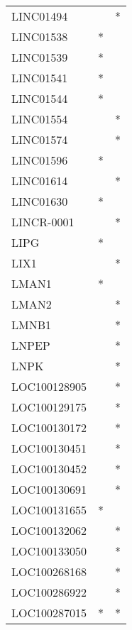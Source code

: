 \begin{longtable}{lcc}
LINC01494       &                &          * \\
LINC01538       &              * &            \\
LINC01539       &              * &            \\
LINC01541       &              * &            \\
LINC01544       &              * &            \\
LINC01554       &                &          * \\
LINC01574       &                &          * \\
LINC01596       &              * &            \\
LINC01614       &                &          * \\
LINC01630       &              * &            \\
LINCR-0001      &                &          * \\
LIPG            &              * &            \\
LIX1            &                &          * \\
LMAN1           &              * &            \\
LMAN2           &                &          * \\
LMNB1           &                &          * \\
LNPEP           &                &          * \\
LNPK            &                &          * \\
LOC100128905    &                &          * \\
LOC100129175    &                &          * \\
LOC100130172    &                &          * \\
LOC100130451    &                &          * \\
LOC100130452    &                &          * \\
LOC100130691    &                &          * \\
LOC100131655    &              * &            \\
LOC100132062    &                &          * \\
LOC100133050    &                &          * \\
LOC100268168    &                &          * \\
LOC100286922    &                &          * \\
LOC100287015    &              * &          * \\

\end{longtable}

